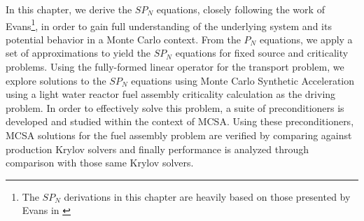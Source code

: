 In this chapter, we derive the $SP_N$ equations, closely following the
work of Evans\footnote{The $SP_N$ derivations in this chapter are
  heavily based on those presented by Evans in
  \citep{evans_simpli_2013}}, in order to gain full understanding of
the underlying system and its potential behavior in a Monte Carlo
context. From the $P_N$ equations, we apply a set of approximations to
yield the $SP_N$ equations for fixed source and criticality
problems. Using the fully-formed linear operator for the transport
problem, we explore solutions to the $SP_N$ equations using Monte
Carlo Synthetic Acceleration using a light water reactor fuel assembly
criticality calculation as the driving problem. In order to
effectively solve this problem, a suite of preconditioners is
developed and studied within the context of MCSA. Using these
preconditioners, MCSA solutions for the fuel assembly problem are
verified by comparing against production Krylov solvers and finally
performance is analyzed through comparison with those same Krylov
solvers.

